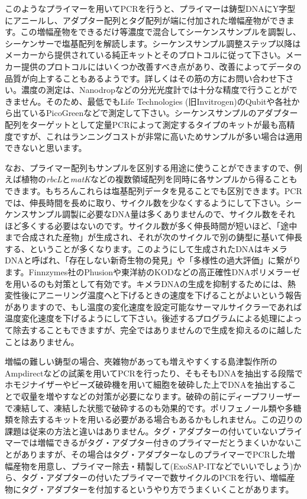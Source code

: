 \documentclass[titlepage,10pt,a4paper]{jsbook}
\begin{document}
このようなプライマーを用いてPCRを行うと、プライマーは鋳型DNAにY字型にアニールし、アダプター配列とタグ配列が端に付加された増幅産物ができます。この増幅産物をできるだけ等濃度で混合してシーケンスサンプルを調製し、シーケンサーで塩基配列を解読します。シーケンスサンプル調整ステップ以降はメーカーから提供されている純正キットとそのプロトコルに従って下さい。メーカー提供のプロトコルにはいくつか改善すべき点があり、改善によってデータの品質が向上することもあるようです。詳しくはその筋の方にお問い合わせ下さい。濃度の測定は、Nanodropなどの分光光度計では十分な精度で行うことができません。そのため、最低でもLife Technologies (旧Invitrogen)のQubitや各社から出ているPicoGreenなどで測定して下さい。シーケンスサンプルのアダプター配列をターゲットとして定量PCRによって測定するタイプのキットが最も高精度ですが、これはランニングコストが非常に高いためサンプルが多い場合は適用できないと思います。

なお、プライマー配列もサンプルを区別する用途に使うことができますので、例えば植物の\textit{rbcL}と\textit{matK}などの複数領域配列を同時に各サンプルから得ることもできます。もちろんこれらは塩基配列データを見ることでも区別できます。PCRでは、伸長時間を長めに取り、サイクル数を少なくするようにして下さい。シーケンスサンプル調製に必要なDNA量は多くありませんので、サイクル数をそれほど多くする必要はないのです。サイクル数が多く伸長時間が短いほど、「途中まで合成された産物」が生成され、それが次のサイクルで別の鋳型に基いて伸長する、ということが多くなります。このようにして生成されたDNAはキメラDNAと呼ばれ、「存在しない新奇生物の発見」や「多様性の過大評価」に繋がります。Finnzymes社のPhusionや東洋紡のKODなどの高正確性DNAポリメラーゼを用いるのも対策として有効です。キメラDNAの生成を抑制するためには、熱変性後にアニーリング温度へと下げるときの速度を下げることがよいという報告があります\citep{Stevens2013}ので、もし温度の変化速度を設定可能なサーマルサイクラーであれば温度変化速度を下げるようにして下さい。後述するプログラムによる処理によって除去することもできますが、完全ではありませんので生成を抑えるのに越したことはありません。

増幅の難しい鋳型の場合、夾雑物があっても増えやすくする島津製作所のAmpdirectなどの試薬を用いてPCRを行ったり、そもそもDNAを抽出する段階でホモジナイザーやビーズ破砕機を用いて細胞を破砕した上でDNAを抽出することで収量を増やすなどの対策が必要になります。破砕の前にディープフリーザーで凍結して、凍結した状態で破砕するのも効果的です。ポリフェノール類や多糖類を除去するキットを用いる必要がある場合もあるかもしれません。この辺りの課題は従来の方法と違いはありません。タグ・アダプターの付いていないプライマーでは増幅できるがタグ・アダプター付きのプライマーだとうまくいかないことがありますが、その場合はタグ・アダプターなしのプライマーでPCRした増幅産物を用意し、プライマー除去・精製して(ExoSAP-ITなどでいいでしょう)から、タグ・アダプターの付いたプライマーで数サイクルのPCRを行い、増幅産物にタグ・アダプターを付加するというやり方でうまくいくことがあります。
\end{document}
